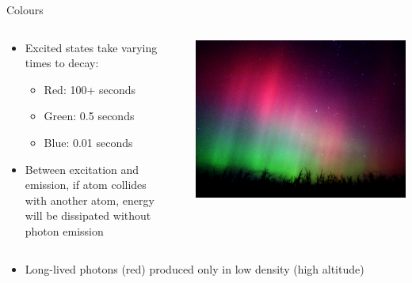 \documentclass[xcolor=pdftex,dvipsnames,table,usenames,11pt]{beamer}
\begin{document}
\begin{frame}{Colours}
\begin{columns}[onlytextwidth]
  \begin{column}{0.6\textwidth}
    \begin{itemize}
    \item Excited states take varying times to decay:
    \begin{itemize}
        \item Red: 100+ seconds
        \item Green: 0.5 seconds
        \item Blue: 0.01 seconds
    \end{itemize}
    \item Between excitation and emission, if atom collides with another atom, energy will be dissipated without photon emission
    \end{itemize}
  \end{column}
  \begin{column}{0.05\textwidth}
  \end{column}
  \begin{column}{0.4\textwidth}
    \includegraphics[width=\textwidth]{img/p4a.jpg}
  \end{column}
\end{columns} 
\begin{itemize}
    \item Long-lived photons (red) produced only in low density (high altitude)
\end{itemize}
\end{frame}
\end{document}
